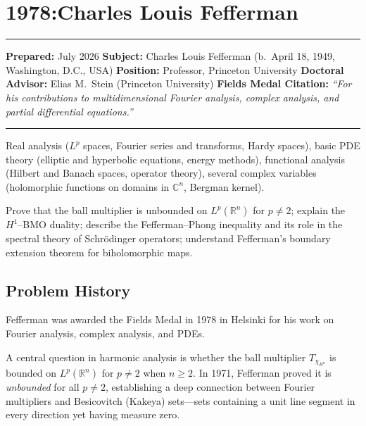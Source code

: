 \chapter{1978:Charles Louis Fefferman}\label{ch1978charleslouisfefferman:charles-louis-fefferman-fields-medal-1978-a-comprehensive-report-on-his-work-and-impact}

\begin{center}\rule{0.5\linewidth}{0.5pt}\end{center}

\textbf{Prepared:} July 2026 \textbf{Subject:} Charles Louis Fefferman
(b.\ April 18, 1949, Washington, D.C., USA) \textbf{Position:}
Professor, Princeton University \textbf{Doctoral Advisor:} Elias M.\
Stein (Princeton University) \textbf{Fields Medal Citation:}
\emph{``For his contributions to multidimensional Fourier analysis,
complex analysis, and partial differential equations.''}

\begin{center}\rule{0.5\linewidth}{0.5pt}\end{center}

\begin{prereqs} Real analysis ($L^p$ spaces, Fourier series and
transforms, Hardy spaces), basic PDE theory (elliptic and hyperbolic
equations, energy methods), functional analysis (Hilbert and Banach
spaces, operator theory), several complex variables (holomorphic
functions on domains in $\mathbb{C}^n$, Bergman kernel).
\end{prereqs}

\begin{objectives} Prove that the ball multiplier is unbounded on
$L^p(\mathbb{R}^n)$ for $p \ne 2$; explain the $H^1$--BMO duality;
describe the Fefferman--Phong inequality and its role in the spectral
theory of Schr\"{o}dinger operators; understand Fefferman's boundary
extension theorem for biholomorphic maps.
\end{objectives}

\section{Problem History}

Fefferman was awarded the Fields Medal in 1978 in Helsinki for his work
on Fourier analysis, complex analysis, and PDEs.

A central question in harmonic analysis is whether the ball multiplier
$T_{\chi_{B^n}}$ is bounded on $L^p(\mathbb{R}^n)$ for $p \ne 2$ when
$n \ge 2$. In 1971, Fefferman proved it is \emph{unbounded} for all
$p \ne 2$, establishing a deep connection between Fourier multipliers
and Besicovitch (Kakeya) sets---sets containing a unit line segment in
every direction yet having measure zero.

